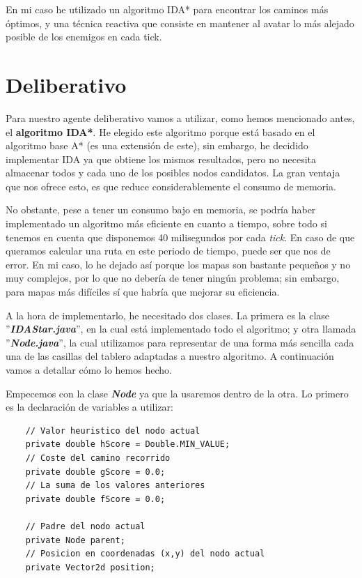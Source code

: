 \documentclass[11pt,a4paper]{article}
\begin{document}
En mi caso he utilizado un algoritmo IDA* para encontrar los caminos más óptimos, y una técnica reactiva
que consiste en mantener al avatar lo más alejado posible de los enemigos en cada tick.


\section{Deliberativo}

Para nuestro agente deliberativo vamos a utilizar, como hemos mencionado antes, el \textbf{algoritmo IDA*}.
He elegido este algoritmo porque está basado en el algoritmo base A* (es una extensión de este), sin embargo,
he decidido implementar IDA ya que obtiene los mismos resultados, pero no necesita almacenar todos y cada uno
de los posibles nodos candidatos. La gran ventaja que nos ofrece esto, es que reduce considerablemente el
consumo de memoria.

No obstante, pese a tener un consumo bajo en memoria, se podría haber implementado un algoritmo más eficiente
en cuanto a tiempo, sobre todo si tenemos en cuenta que disponemos 40 milisegundos por cada \textit{tick}. En
caso de que queramos calcular una ruta en este periodo de tiempo, puede ser que nos de error. En mi caso,
lo he dejado así porque los mapas son bastante pequeños y no muy complejos, por lo que no debería de tener
ningún problema; sin embargo, para mapas más difíciles sí que habría que mejorar su eficiencia.

A la hora de implementarlo, he necesitado dos clases. La primera es la clase ''\textbf{\textit{IDAStar.java}}'',
en la cual está implementado todo el algoritmo; y otra llamada ''\textbf{\textit{Node.java}}'', la cual
utilizamos para representar de una forma más sencilla cada una de las casillas del tablero adaptadas a nuestro
algoritmo. A continuación vamos a detallar cómo lo hemos hecho.

Empecemos con la clase \textbf{\textit{Node}} ya que la usaremos dentro de la otra. Lo primero es la declaración de
variables a utilizar:
\newline
\begin{lstlisting}
    // Valor heuristico del nodo actual
    private double hScore = Double.MIN_VALUE;
    // Coste del camino recorrido
    private double gScore = 0.0;
    // La suma de los valores anteriores
    private double fScore = 0.0;

    // Padre del nodo actual
    private Node parent;
    // Posicion en coordenadas (x,y) del nodo actual
    private Vector2d position;
\end{lstlisting}
\end{document}
